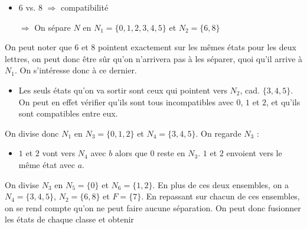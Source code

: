 \begin{correction*}
\begin{itemize}
\item 6 vs. 8 $\Rightarrow$ compatibilité

\item[$\Rightarrow$] On sépare $N$ en $N_1 = \{0,1,2,3,4,5\}$ et $N_2 = \{6,8\}$

\end{itemize}

On peut noter que $6$ et $8$ pointent exactement sur les mêmes états pour les deux lettres, on peut donc être sûr qu'on n'arrivera pas à les séparer, quoi qu'il arrive à $N_1$. On s'intéresse donc à ce dernier.

\begin{itemize}

\item Les seuls états qu'on va sortir sont ceux qui pointent vers $N_2$, cad. $\{3,4,5\}$. On peut en effet vérifier qu'ils sont tous incompatibles avec $0$, $1$ et $2$, et qu'ils sont compatibles entre eux.

\end{itemize}


On divise donc $N_1$ en $N_3 = \{0,1,2\}$ et $N_4 = \{3,4,5\}$. On regarde $N_3$ :

\begin{itemize}

\item $1$ et $2$ vont vers $N_4$ avec $b$ alors que $0$ reste en $N_3$. $1$ et $2$ envoient vers le même état avec $a$. 
\end{itemize}

On divise $N_3$ en $N_5 = \{0\}$ et $N_6 = \{1,2\}$. En plus de ces deux ensembles, on a $N_4 = \{3,4,5\}$, $N_2 = \{6,8\}$ et $F = \{7\}$.
En repassant sur chacun de ces ensembles, on se rend compte qu'on ne peut faire aucune séparation. On peut donc fusionner les états de chaque classe et obtenir 


\begin{figure}[!ht]
\centering
{}
\end{figure}
\end{correction*}
